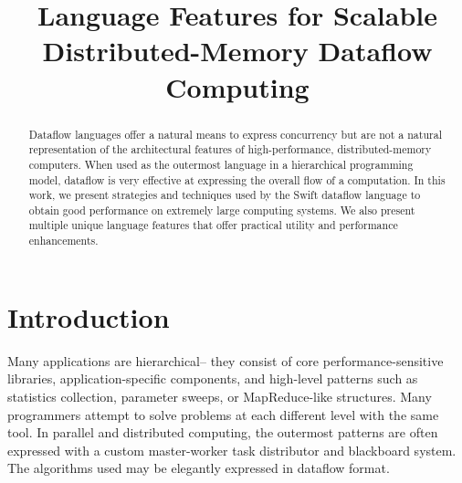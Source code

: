 \documentclass[conference,10pt]{IEEEtran}
\begin{document}
\setlength{\pdfpageheight}{\paperheight}
\setlength{\pdfpagewidth}{\paperwidth}

\newcommand{\topic}[1] { { \noindent $\bullet$ \textbf{ #1:}}}


\title{Language Features for Scalable Distributed-Memory Dataflow Computing}

\author{
}

\maketitle

\begin{abstract}

Dataflow languages offer a natural means to express concurrency but
are not a natural representation of the architectural features of
high-performance, distributed-memory computers.  When used as the
outermost language in a hierarchical programming model, dataflow is
very effective at expressing the overall flow of a computation.
In this work, we present strategies and techniques used by the Swift
dataflow language to obtain good performance on extremely large
computing systems.  We also present multiple unique language features
that offer practical utility and performance enhancements.

\end{abstract}

\section{Introduction}

Many applications are hierarchical-- they consist of core
performance-sensitive libraries, application-specific components, and
high-level patterns such as statistics collection, parameter sweeps,
or MapReduce-like structures.  Many programmers attempt to solve
problems at each different level with the same tool.  In parallel and
distributed computing, the outermost patterns are often expressed with
a custom master-worker task distributor and blackboard system.  The
algorithms used may be elegantly expressed in dataflow format.
\end{document}
